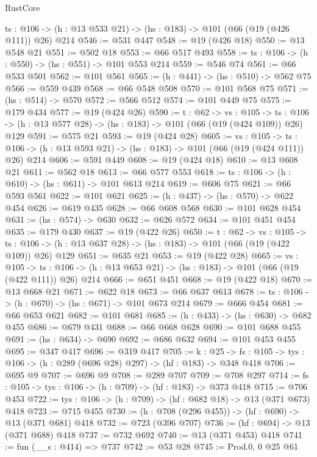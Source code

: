 \begin{lexlean}{RustCore}
\begin{coremodule}
  {ts : @106} -> (h : @13 @533 @21) -> (hs : @183) -> @101 (@66 (@19 (@426 @111)) @26) @214
@546 := @531 @447
@548 := @19 (@426 @18)
@550 := @13 @548 @21
@551 := @502 @18
@553 := @66 @517 @493
@558 := {ts : @106} -> (h : @550) -> (hs : @551) -> @101 @553 @214
@559 := @546 @74
@561 := @66 @533 @501
@562 := @101 @561
@565 := (h : @441) -> (hs : @510) -> @562 @75
@566 := @559 @439
@568 := @66 @548 @508
@570 := @101 @568 @75
@571 := (hs : @514) -> @570
@572 := @566 @512
@574 := @101 @449 @75
@575 := @179 @434
@577 := @19 (@424 @26)
@590 := {t : @62} ->
  {vs : @105} ->
  {ts : @106} -> (h : @13 @577 @28) -> (hs : @183) -> @101 (@66 (@19 (@424 @109)) @26) @129
@591 := @575 @21
@593 := @19 (@424 @28)
@605 := {vs : @105} ->
  {ts : @106} -> (h : @13 @593 @21) -> (hs : @183) -> @101 (@66 (@19 (@424 @111)) @26) @214
@606 := @591 @449
@608 := @19 (@424 @18)
@610 := @13 @608 @21
@611 := @562 @18
@613 := @66 @577 @553
@618 := {ts : @106} -> (h : @610) -> (hs : @611) -> @101 @613 @214
@619 := @606 @75
@621 := @66 @593 @561
@622 := @101 @621
@625 := (h : @437) -> (hs : @570) -> @622 @454
@626 := @619 @435
@628 := @66 @608 @568
@630 := @101 @628 @454
@631 := (hs : @574) -> @630
@632 := @626 @572
@634 := @101 @451 @454
@635 := @179 @430
@637 := @19 (@422 @26)
@650 := {t : @62} ->
  {vs : @105} ->
  {ts : @106} -> (h : @13 @637 @28) -> (hs : @183) -> @101 (@66 (@19 (@422 @109)) @26) @129
@651 := @635 @21
@653 := @19 (@422 @28)
@665 := {vs : @105} ->
  {ts : @106} -> (h : @13 @653 @21) -> (hs : @183) -> @101 (@66 (@19 (@422 @111)) @26) @214
@666 := @651 @451
@668 := @19 (@422 @18)
@670 := @13 @668 @21
@671 := @622 @18
@673 := @66 @637 @613
@678 := {ts : @106} -> (h : @670) -> (hs : @671) -> @101 @673 @214
@679 := @666 @454
@681 := @66 @653 @621
@682 := @101 @681
@685 := (h : @433) -> (hs : @630) -> @682 @455
@686 := @679 @431
@688 := @66 @668 @628
@690 := @101 @688 @455
@691 := (hs : @634) -> @690
@692 := @686 @632
@694 := @101 @453 @455
@695 := @347 @417
@696 := @319 @417
@705 := {k : @25} ->
  {fs : @105} -> {tys : @106} -> (h : @289 (@696 @28) @297) -> (hf : @183) -> @348 @418
@706 := @695 @9
@707 := @696 @9
@708 := @289 @707
@709 := @708 @297
@714 := {fs : @105} -> {tys : @106} -> (h : @709) -> (hf : @183) -> @373 @418
@715 := @706 @453
@722 := {tys : @106} -> (h : @709) -> (hf : @682 @18) -> @13 (@371 @673) @418
@723 := @715 @455
@730 := (h : @708 (@296 @455)) -> (hf : @690) -> @13 (@371 @681) @418
@732 := @723 (@396 @707)
@736 := (hf : @694) -> @13 (@371 @688) @418
@737 := @732 @692
@740 := @13 (@371 @453) @418
@741 := fun (__s : @414) => @737
@742 := @53 @28
@745 := Prod.{0, 0} @25 @61

\end{coremodule}
\end{lexlean}

